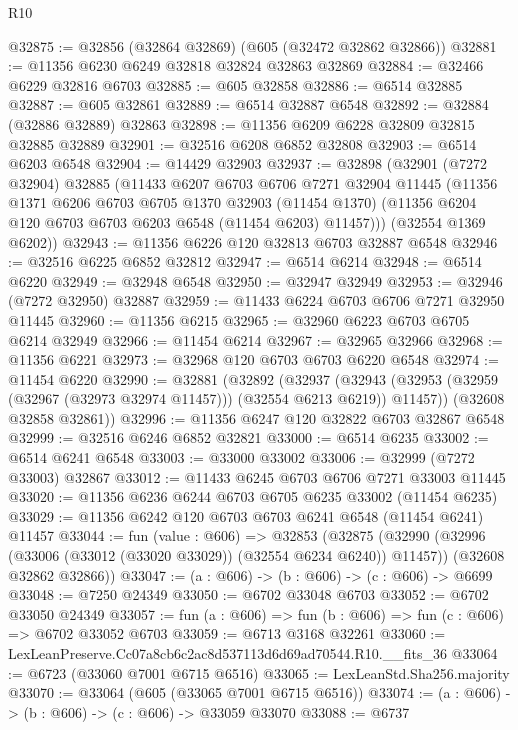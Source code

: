 \begin{lexlean}{R10}
\begin{coremodule}
@32875 := @32856 (@32864 @32869) (@605 (@32472 @32862 @32866))
@32881 := @11356 @6230 @6249 @32818 @32824 @32863 @32869
@32884 := @32466 @6229 @32816 @6703
@32885 := @605 @32858
@32886 := @6514 @32885
@32887 := @605 @32861
@32889 := @6514 @32887 @6548
@32892 := @32884 (@32886 @32889) @32863
@32898 := @11356 @6209 @6228 @32809 @32815 @32885 @32889
@32901 := @32516 @6208 @6852 @32808
@32903 := @6514 @6203 @6548
@32904 := @14429 @32903
@32937 := @32898
    (@32901
      (@7272 @32904)
      @32885
      (@11433
        @6207
        @6703
        @6706
        @7271
        @32904
        @11445
        (@11356
          @1371
          @6206
          @6703
          @6705
          @1370
          @32903
          (@11454 @1370)
          (@11356 @6204 @120 @6703 @6703 @6203 @6548 (@11454 @6203) @11457)))
      (@32554 @1369 @6202))
@32943 := @11356 @6226 @120 @32813 @6703 @32887 @6548
@32946 := @32516 @6225 @6852 @32812
@32947 := @6514 @6214
@32948 := @6514 @6220
@32949 := @32948 @6548
@32950 := @32947 @32949
@32953 := @32946 (@7272 @32950) @32887
@32959 := @11433 @6224 @6703 @6706 @7271 @32950 @11445
@32960 := @11356 @6215
@32965 := @32960 @6223 @6703 @6705 @6214 @32949
@32966 := @11454 @6214
@32967 := @32965 @32966
@32968 := @11356 @6221
@32973 := @32968 @120 @6703 @6703 @6220 @6548
@32974 := @11454 @6220
@32990 := @32881
    (@32892
      (@32937
        (@32943 (@32953 (@32959 (@32967 (@32973 @32974 @11457))) (@32554 @6213 @6219)) @11457))
      (@32608 @32858 @32861))
@32996 := @11356 @6247 @120 @32822 @6703 @32867 @6548
@32999 := @32516 @6246 @6852 @32821
@33000 := @6514 @6235
@33002 := @6514 @6241 @6548
@33003 := @33000 @33002
@33006 := @32999 (@7272 @33003) @32867
@33012 := @11433 @6245 @6703 @6706 @7271 @33003 @11445
@33020 := @11356 @6236 @6244 @6703 @6705 @6235 @33002 (@11454 @6235)
@33029 := @11356 @6242 @120 @6703 @6703 @6241 @6548 (@11454 @6241) @11457
@33044 := fun (value : @606) =>
  @32853
    (@32875
      (@32990 (@32996 (@33006 (@33012 (@33020 @33029)) (@32554 @6234 @6240)) @11457))
      (@32608 @32862 @32866))
@33047 := (a : @606) -> (b : @606) -> (c : @606) -> @6699
@33048 := @7250 @24349
@33050 := @6702 @33048 @6703
@33052 := @6702 @33050 @24349
@33057 := fun (a : @606) => fun (b : @606) => fun (c : @606) => @6702 @33052 @6703
@33059 := @6713 @3168 @32261
@33060 := LexLeanPreserve.Cc07a8cb6c2ac8d537113d6d69ad70544.R10.__fits_36
@33064 := @6723 (@33060 @7001 @6715 @6516)
@33065 := LexLeanStd.Sha256.majority
@33070 := @33064 (@605 (@33065 @7001 @6715 @6516))
@33074 := (a : @606) -> (b : @606) -> (c : @606) -> @33059 @33070
@33088 := @6737

\end{coremodule}
\end{lexlean}
